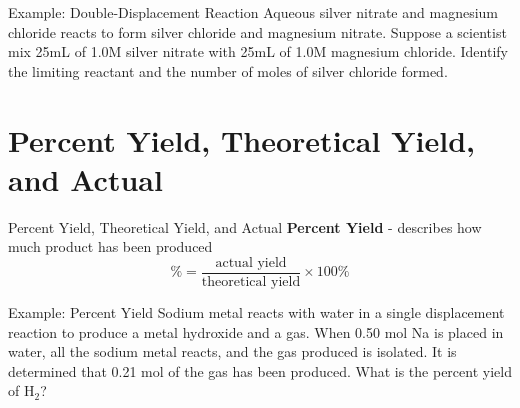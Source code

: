 \documentclass[11pt]{beamer}
\begin{document}
\begin{frame}{Example: Double-Displacement Reaction}
  Aqueous silver nitrate and magnesium chloride reacts to
  form silver chloride and magnesium nitrate. Suppose
  a scientist mix 25mL of 1.0M silver nitrate with 25mL of 1.0M magnesium chloride.
  Identify the limiting reactant and the number of moles of silver chloride formed.
  
  \vfill
\end{frame}

\section{Percent Yield, Theoretical Yield, and Actual}

\begin{frame}{Percent Yield, Theoretical Yield, and Actual}
  \textbf{Percent Yield} - describes how much product has been
  produced
  \begin{equation}
    \% = \frac{\text{actual yield}}{\text{theoretical yield}} \times 100\%
  \end{equation}
  
\end{frame}

\begin{frame}{Example: Percent Yield}
  Sodium metal reacts with water in a single displacement reaction to produce
  a metal hydroxide and a gas. When 0.50 mol Na is placed in water, all the sodium
  metal reacts, and the gas produced is isolated. It is determined that 0.21 mol of the gas
  has been produced. What is the percent yield of H$_2$?

  \vfill
\end{frame}
\end{document}
